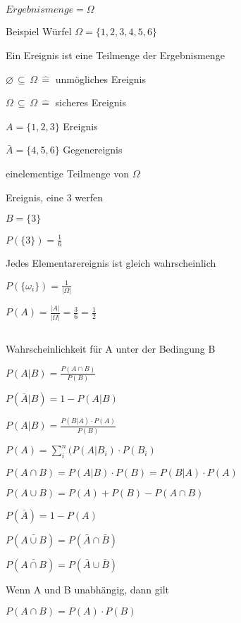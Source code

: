 \documentclass[10pt,a4paper,landscape]{article}
\begin{document}
\begin{multicols*}{4}
\section{}
\subsection{}
\parbox{\columnwidth}{\centering$Ergebnismenge = \Omega$}
\parbox{\columnwidth}{\centering Beispiel Würfel $\Omega = \{ 1, 2, 3, 4, 5, 6 \}$}
\parbox{\columnwidth}{\centering Ein Ereignis ist eine Teilmenge der Ergebnismenge}
\parbox{\columnwidth}{\centering$\varnothing \, \subseteq \, \Omega \, \widehat{=}$ unmögliches Ereignis}
\parbox{\columnwidth}{\centering$\Omega \, \subseteq \, \Omega \, \widehat{=}$ sicheres Ereignis}
\parbox{\columnwidth}{\centering$A = \{1, 2, 3 \}$ Ereignis}
\parbox{\columnwidth}{\centering$\bar{A} = \{4, 5, 6 \}$ Gegenereignis}
\parbox{\columnwidth}{\centering einelementige Teilmenge von $\Omega$}
\parbox{\columnwidth}{\centering Ereignis, eine 3 werfen}
\parbox{\columnwidth}{\centering $B = \{ 3 \}$}
\parbox{\columnwidth}{\centering $P(\{3\}) = \frac{1}{6}$}
\parbox{\columnwidth}{\centering Jedes Elementarereignis ist gleich wahrscheinlich}
\parbox{\columnwidth}{\centering $P(\{\omega_i\}) = \frac{1}{\vert \Omega \vert}$}
\parbox{\columnwidth}{\centering $P(A) = \frac{\vert A \vert}{\vert \Omega \vert} = \frac{3}{6} = \frac{1}{2}$}
\subsection{}
\parbox{\columnwidth}{\centering Wahrscheinlichkeit für A unter der Bedingung B}
\parbox{\columnwidth}{\centering $P(A \vert B) = \frac{P(A \cap B)}{P(B)}$}
\parbox{\columnwidth}{\centering $P(\bar{A} \vert B) = 1 - P(A \vert B)$}
\parbox{\columnwidth}{\centering $P(A \vert B) = \frac{P(B \vert A) \cdot P(A)}{P(B)}$}
\parbox{\columnwidth}{\centering $P(A) = \sum \limits_{i}^n (P(A \vert B_i) \cdot P(B_i)$}
\parbox{\columnwidth}{\centering $P(A \cap B) = P(A \vert B) \cdot P(B) = P(B \vert A) \cdot P(A)$}
\parbox{\columnwidth}{\centering $P(A \cup B) = P(A) + P(B) - P(A \cap B)$}
\parbox{\columnwidth}{\centering $P(\bar{A}) = 1 - P(A)$}
\parbox{\columnwidth}{\centering $P(\bar{A \cup B}) = P(\bar{A} \cap \bar{B})$}
\parbox{\columnwidth}{\centering $P(\bar{A \cap B}) = P(\bar{A} \cup \bar{B})$}
\parbox{\columnwidth}{\centering Wenn A und B unabhängig, dann gilt}
\parbox{\columnwidth}{\centering $P(A \cap B) = P(A) \cdot P(B)$}

\end{multicols*}
\end{document}
